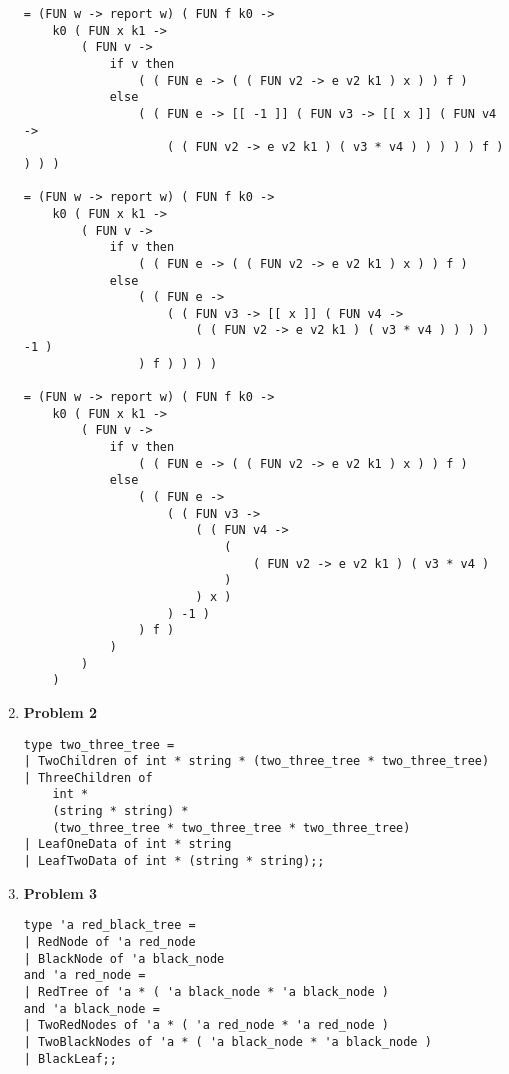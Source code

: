 \begin{enumerate}
\begin{lstlisting}
= (FUN w -> report w) ( FUN f k0 ->
    k0 ( FUN x k1 ->
        ( FUN v ->
            if v then
                ( ( FUN e -> ( ( FUN v2 -> e v2 k1 ) x ) ) f )
            else
                ( ( FUN e -> [[ -1 ]] ( FUN v3 -> [[ x ]] ( FUN v4 ->
                    ( ( FUN v2 -> e v2 k1 ) ( v3 * v4 ) ) ) ) ) f ) ) ) )

= (FUN w -> report w) ( FUN f k0 ->
    k0 ( FUN x k1 ->
        ( FUN v ->
            if v then
                ( ( FUN e -> ( ( FUN v2 -> e v2 k1 ) x ) ) f )
            else
                ( ( FUN e ->
                    ( ( FUN v3 -> [[ x ]] ( FUN v4 -> 
                    	( ( FUN v2 -> e v2 k1 ) ( v3 * v4 ) ) ) ) -1 )
                ) f ) ) ) )

= (FUN w -> report w) ( FUN f k0 ->
    k0 ( FUN x k1 ->
        ( FUN v ->
            if v then
                ( ( FUN e -> ( ( FUN v2 -> e v2 k1 ) x ) ) f )
            else
                ( ( FUN e ->
                    ( ( FUN v3 ->
                        ( ( FUN v4 ->
                            (
                                ( FUN v2 -> e v2 k1 ) ( v3 * v4 )
                            )
                        ) x )
                    ) -1 )
                ) f )
            )
        )
    )	
    \end{lstlisting}
	
	\item[]{\textbf{Problem 2}}
	
	\begin{lstlisting}
type two_three_tree =
| TwoChildren of int * string * (two_three_tree * two_three_tree)
| ThreeChildren of 
	int * 
	(string * string) * 
	(two_three_tree * two_three_tree * two_three_tree)
| LeafOneData of int * string
| LeafTwoData of int * (string * string);;
	\end{lstlisting}
	
	\item[]{\textbf{Problem 3}}
	
	\begin{lstlisting}
type 'a red_black_tree =
| RedNode of 'a red_node
| BlackNode of 'a black_node
and 'a red_node =
| RedTree of 'a * ( 'a black_node * 'a black_node )
and 'a black_node =
| TwoRedNodes of 'a * ( 'a red_node * 'a red_node )
| TwoBlackNodes of 'a * ( 'a black_node * 'a black_node )
| BlackLeaf;;
   	\end{lstlisting}

\end{enumerate}



